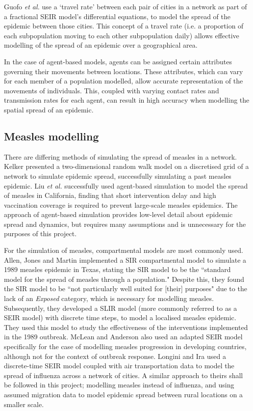 Guofo \textit{et al.} \cite{goufo2014fractional} use a `travel rate' between each pair of cities in a network as part of a fractional SEIR model's differential equations, to model the spread of the epidemic between those cities. This concept of a travel rate (i.e. a proportion of each subpopulation moving to each other subpopulation daily) allows effective modelling of the spread of an epidemic over a geographical area.

In the case of agent-based models, agents can be assigned certain attributes governing their movements between locations. These attributes, which can vary for each member of a population modelled, allow accurate representation of the movements of individuals. This, coupled with varying contact rates and transmission rates for each agent, can result in high accuracy when modelling the spatial spread of an epidemic.

\subsection{Measles modelling}
There are differing methods of simulating the spread of measles in a network. Kelker \cite{Kelker1973} presented a two-dimensional random walk model on a discretised grid of a network to simulate epidemic spread, successfully simulating a past measles epidemic. Liu \textit{et al.} \cite{liu2015role} successfully used agent-based simulation to model the spread of measles in California, finding that short intervention delay and high vaccination coverage is required to prevent large-scale measles epidemics. The approach of agent-based simulation provides low-level detail about epidemic spread and dynamics, but requires many assumptions and is unnecessary for the purposes of this project.

For the simulation of measles, compartmental models are most commonly used. Allen, Jones and Martin \cite{allen1990mathematical} implemented a SIR compartmental model to simulate a 1989 measles epidemic in Texas, stating the SIR model to be the ``standard model for the spread of measles through a population." Despite this, they found the SIR model to be ``not particularly well suited for [their] purposes" due to the lack of an \textit{Exposed} category, which is necessary for modelling measles. Subsequently, they developed a SLIR model (more commonly referred to as a SEIR model) with discrete time steps, to model a localised measles epidemic. They used this model to study the effectiveness of the interventions implemented in the 1989 outbreak.
McLean and Anderson \cite{mclean1988measles} also used an adapted SEIR model specifically for the case of modelling measles progression in developing countries, although not for the context of outbreak response. 
Longini and Ira \cite{longini1988mathematical} used a discrete-time SEIR model coupled with air transportation data to model the spread of influenza across a network of cities. A similar approach to theirs shall be followed in this project; modelling measles instead of influenza, and using assumed migration data to model epidemic spread between rural locations on a smaller scale.

